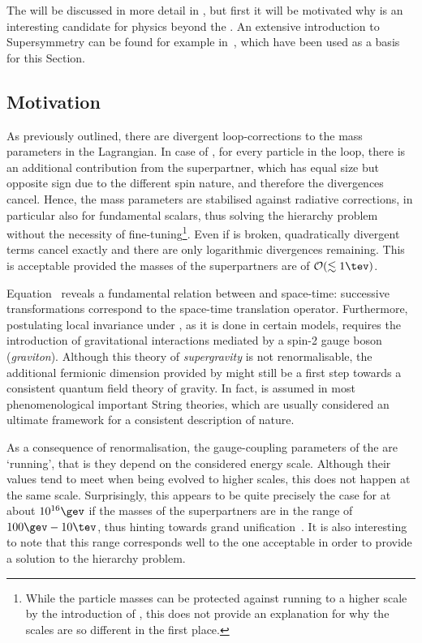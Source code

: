 The \mssm will be discussed in more detail in , but first it will be motivated why \susy is an interesting candidate for physics beyond the \sm.
An extensive introduction to Supersymmetry can be found for example in~\cite{bib:Aitchison:Susy,bib:BaerTata:WeakScaleSusy}, which have been used as a basis for this Section.


\subsection{Motivation}
As previously outlined, there are divergent loop-corrections to the mass parameters in the Lagrangian.
In case of \susy, for every \sm particle in the loop, there is an additional contribution from the superpartner, which has equal size but opposite sign due to the different spin nature, and therefore the divergences cancel.
Hence, the mass parameters are stabilised against radiative corrections, in particular also for fundamental scalars, thus solving the hierarchy problem without the necessity of fine-tuning\footnote{While the particle masses can be protected against running to a higher scale by the introduction of \susy, this does not provide an explanation for why the scales are so different in the first place.}.
Even if \susy is broken, quadratically divergent terms cancel exactly and there are only logarithmic divergences remaining.
This is acceptable provided the masses of the superpartners are of $\mathcal{O}(\lesssim1\tev)$.

Equation~ reveals a fundamental relation between \susy and space-time: successive \susy transformations correspond to the space-time translation operator.
Furthermore, postulating local invariance under \susy, as it is done in certain models, requires the introduction of gravitational interactions mediated by a spin-2 gauge boson (\emph{graviton})\addref.
Although this theory of \emph{supergravity} is not renormalisable, the additional fermionic dimension provided by \susy might still be a first step towards a consistent quantum field theory of gravity.
In fact, \susy is assumed in most phenomenological important String theories, which are usually considered an ultimate framework for a consistent description of nature.

As a consequence of renormalisation, the gauge-coupling parameters of the \sm are `running', that is they depend on the considered energy scale.
Although their values tend to meet when being evolved to higher scales, this does not happen at the same scale.
Surprisingly, this appears to be quite precisely the case for \susy at about $10^{16}\gev$ if the masses of the superpartners are in the range of \mbox{$100\gev-10\tev$}, thus hinting towards grand unification~\cite{PhysRevD.24.1681}.
It is also interesting to note that this range corresponds well to the one acceptable in order to provide a solution to the hierarchy problem.

